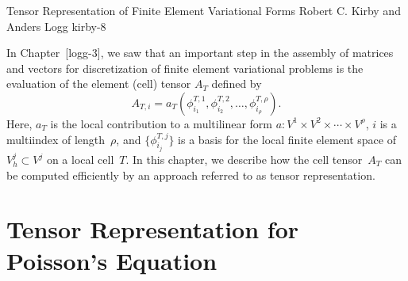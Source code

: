               {Tensor Representation of Finite Element Variational Forms}
              {Robert C. Kirby and Anders Logg}
              {kirby-8}

In Chapter~[logg-3], we saw that an important step in the assembly of
matrices and vectors for discretization of finite element variational
problems is the evaluation of the element (cell) tensor $A_T$ defined
by
\begin{equation*}
  A_{T,i}
  = a_T(\phi^{T,1}_{i_1}, \phi^{T,2}_{i_2}, \ldots, \phi^{T,\rho}_{i_{\rho}}).
\end{equation*}
Here, $a_T$ is the local contribution to a multilinear form $a:
V^1 \times V^2 \times \cdots \times V^{\rho}$, $i$ is a multiindex of
length~$\rho$, and $\{\phi^{T,j}_{i_j}\}$ is a basis for the local
finite element space of $V^j_h \subset V^j$ on a local cell~$T$. In
this chapter, we describe how the cell tensor~$A_T$ can be computed
efficiently by an approach referred to as tensor representation.

\section{Tensor Representation for Poisson's Equation}

